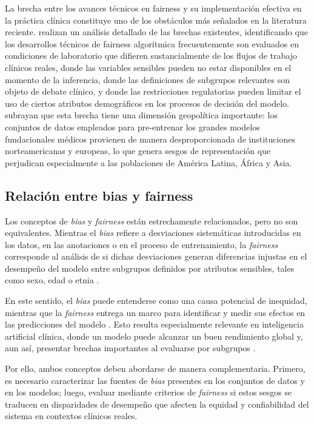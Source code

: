 La brecha entre los avances técnicos en fairness y su implementación efectiva en la práctica clínica constituye uno 
de los obstáculos más señalados en la literatura reciente. \citeauthor{liu2024gaps} realizan un análisis detallado 
de las brechas existentes, identificando que los desarrollos técnicos de fairness algorítmica frecuentemente son 
evaluados en condiciones de laboratorio que difieren sustancialmente de los flujos de trabajo clínicos reales, 
donde las variables sensibles pueden no estar disponibles en el momento de la inferencia, donde las definiciones 
de subgrupos relevantes son objeto de debate clínico, y donde las restricciones regulatorias pueden limitar el 
uso de ciertos atributos demográficos en los procesos de decisión del modelo. 
\citeauthor{queiroz2026} subrayan que esta brecha tiene una dimensión geopolítica importante: los conjuntos de datos 
empleados para pre-entrenar los grandes modelos fundacionales médicos provienen de manera desproporcionada de 
instituciones norteamericanas y europeas, lo que genera sesgos de representación que perjudican especialmente a 
las poblaciones de América Latina, África y Asia.

\subsection{Relación entre bias y fairness}

Los conceptos de \textit{bias} y \textit{fairness} están estrechamente relacionados, pero no son equivalentes. 
Mientras el \textit{bias} refiere a desviaciones sistemáticas introducidas en los datos, en las anotaciones o en 
el proceso de entrenamiento, la \textit{fairness} corresponde al análisis de si dichas desviaciones generan diferencias 
injustas en el desempeño del modelo entre subgrupos definidos por atributos sensibles, tales como sexo, edad o etnia 
\parencite{williamson2023,sahiner2023}.

En este sentido, el \textit{bias} puede entenderse como una causa potencial de inequidad, mientras que la \textit{fairness} 
entrega un marco para identificar y medir sus efectos en las predicciones del modelo \parencite{liu2023translational,gao2024}. 
Esto resulta especialmente relevante en inteligencia artificial clínica, donde un modelo puede alcanzar un buen 
rendimiento global y, aun así, presentar brechas importantes al evaluarse por subgrupos \parencite{NEURIPS2024_c9826b9e,williamson2023}.

Por ello, ambos conceptos deben abordarse de manera complementaria. Primero, es necesario caracterizar las fuentes de 
\textit{bias} presentes en los conjuntos de datos y en los modelos; luego, evaluar mediante criterios de \textit{fairness} 
si estos sesgos se traducen en disparidades de desempeño que afecten la equidad y confiabilidad del sistema en contextos 
clínicos reales.